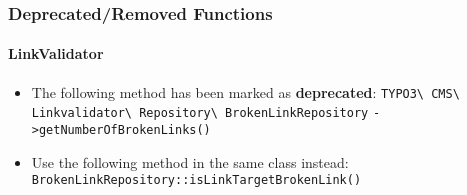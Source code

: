 
\begin{frame}[fragile]
	\frametitle{Deprecated/Removed Functions}
	\framesubtitle{LinkValidator}

	\begin{itemize}
		\item The following method has been marked as \textbf{deprecated}:
		\newline\newline
			\smaller
				\texttt{TYPO3\textbackslash
					CMS\textbackslash
					Linkvalidator\textbackslash
					Repository\textbackslash
					BrokenLinkRepository}\newline
				\texttt{->getNumberOfBrokenLinks()}\normalsize\newline

		\item Use the following method in the same class instead:\newline
			\small\texttt{BrokenLinkRepository::isLinkTargetBrokenLink()}\normalsize

	\end{itemize}

\end{frame}


